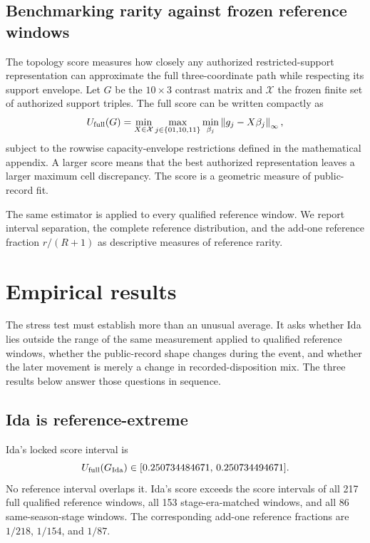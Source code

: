 \documentclass[11pt]{article}
\begin{document}
\subsection{Benchmarking rarity against frozen reference windows}

The topology score measures how closely any authorized restricted-support representation can approximate the full three-coordinate path while respecting its support envelope. Let $G$ be the $10\times3$ contrast matrix and $\mathcal X$ the frozen finite set of authorized support triples. The full score can be written compactly as
\begin{equation}
U_{\mathrm{full}}(G)=
\min_{X\in\mathcal X}\max_{j\in\{01,10,11\}}
\min_{\beta_j}\left\lVert g_j-X\beta_j\right\rVert_{\infty},
\label{eq:score_simple}
\end{equation}
subject to the rowwise capacity-envelope restrictions defined in the mathematical appendix. A larger score means that the best authorized representation leaves a larger maximum cell discrepancy. The score is a geometric measure of public-record fit.

The same estimator is applied to every qualified reference window. We report interval separation, the complete reference distribution, and the add-one reference fraction $r/(R+1)$ as descriptive measures of reference rarity.

\section{Empirical results}

The stress test must establish more than an unusual average. It asks whether Ida lies outside the range of the same measurement applied to qualified reference windows, whether the public-record shape changes during the event, and whether the later movement is merely a change in recorded-disposition mix. The three results below answer those questions in sequence.

\subsection{Ida is reference-extreme}

Ida's locked score interval is
\begin{equation}
U_{\mathrm{full}}(G_{\mathrm{Ida}})\in
[0.250734484671,\,0.250734494671].
\end{equation}
No reference interval overlaps it. Ida's score exceeds the score intervals of all 217 full qualified reference windows, all 153 stage-era-matched windows, and all 86 same-season-stage windows. The corresponding add-one reference fractions are $1/218$, $1/154$, and $1/87$.
\end{document}
